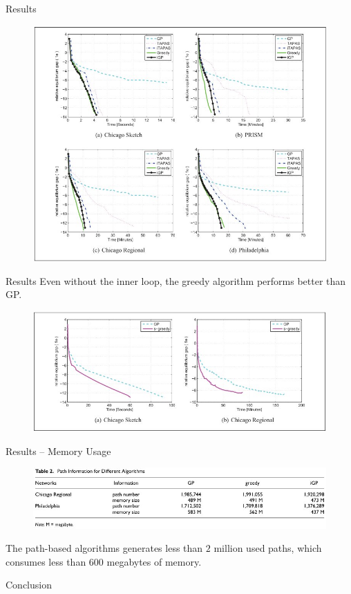 \documentclass{beamer}
\begin{document}
\begin{frame}{Results}
\begin{figure}
\includegraphics[scale=0.35]{./graph1.jpg}
\end{figure}
\end{frame}


\begin{frame}{Results}
Even without the inner loop, the greedy algorithm
performs better than GP.
\begin{figure}
\includegraphics[width=\textwidth]{./graph2.jpg}
\end{figure}
\end{frame}


\begin{frame}{Results -- Memory Usage}
\begin{figure}
\includegraphics[width=\textwidth]{./table1.jpg}
\end{figure}

The path-based algorithms generates less than $2$ million
used paths, which consumes less than $600$ megabytes of
memory.
\end{frame}


\begin{frame}{Conclusion}
\end{frame}
\end{document}
